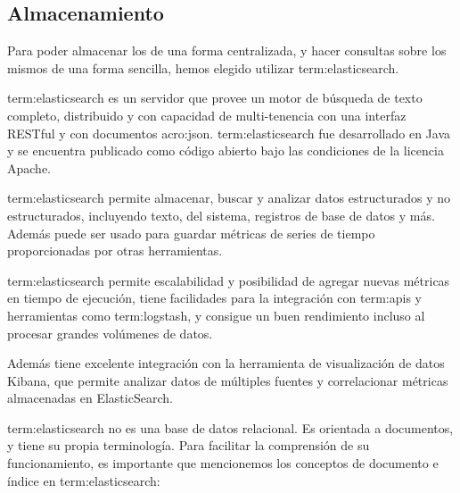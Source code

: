 \subsection{Almacenamiento}
\label{almacenamiento}

Para poder almacenar los  de una forma centralizada, y hacer consultas
sobre los mismos de una forma sencilla, hemos elegido utilizar
\gls{term:elasticsearch}.

\gls{term:elasticsearch} es un servidor que provee un motor de búsqueda de
texto completo, distribuido y con capacidad de multi-tenencia con una interfaz
 RESTful y con documentos \gls{acro:json}. \gls{term:elasticsearch}
fue desarrollado en Java y se encuentra publicado como código abierto bajo las
condiciones de la licencia Apache.

\gls{term:elasticsearch} permite almacenar, buscar y analizar datos
estructurados y no estructurados, incluyendo texto,  del sistema,
registros de base de datos y más. Además puede ser usado para guardar métricas
de series de tiempo proporcionadas por otras herramientas.

\gls{term:elasticsearch} permite escalabilidad y posibilidad de agregar nuevas
métricas en tiempo de ejecución, tiene facilidades para la integración con
\glspl{term:api} y herramientas como \gls{term:logstash}, y consigue un buen
rendimiento incluso al procesar grandes volúmenes de datos.

Además tiene excelente integración con la herramienta de visualización de datos
Kibana, que permite analizar datos de múltiples fuentes y correlacionar
métricas almacenadas en ElasticSearch.

\gls{term:elasticsearch} no es una base de datos relacional. Es orientada a documentos, y
tiene su propia terminología. Para facilitar la comprensión de su
funcionamiento, es importante que mencionemos los conceptos de documento e
índice en \gls{term:elasticsearch}:

